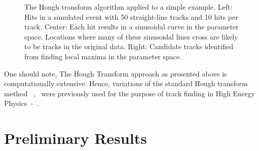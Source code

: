 \documentclass{JINST}
\begin{document}
\begin{figure}[!Hhtb]
\begin{center}
  \caption{The Hough transform algorithm applied to a simple example. Left: Hits in a simulated event with 50
    straight-line tracks and 10 hits per track. Center: Each hit results in a sinusoidal curve in the parameter
    space. Locations where many of these sinusoidal lines cross are likely to be tracks in the original data. Right:
    Candidate tracks identified from finding local maxima in the parameter space.\label{fig:hough}}
\end{center}
\end{figure}

One should note, The Hough Transform approach as presented above is computationally extensive.
Hence, variations of the standard Hough transform method ~\cite{bib:LHT},~\cite{bib:AHT} 
were previously  used for the purpose of track finding in High Energy 
Physics~\cite{bib:slac}-~\cite{bib:cosmicmu}.


\section{Preliminary Results}
\end{document}
